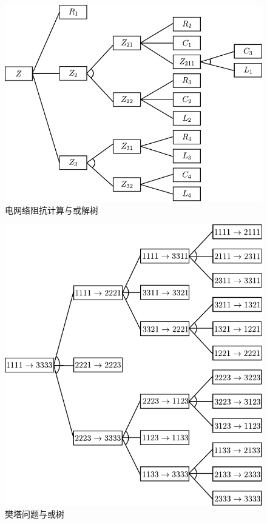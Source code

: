 	\begin{figure}[H]
		\centering
		\includegraphics[scale=.8]{figures/ans-2.4.pdf}
		\caption{电网络阻抗计算与或解树} \label{Fig:and-or-tree-for-elec}
	\end{figure}

	\begin{figure}[H]
		\centering
		\includegraphics[scale=.8]{figures/ans-2.5.pdf}
		\caption{樊塔问题与或树} \label{Fig:and-or-tree-for-hannoi}
	\end{figure} 

